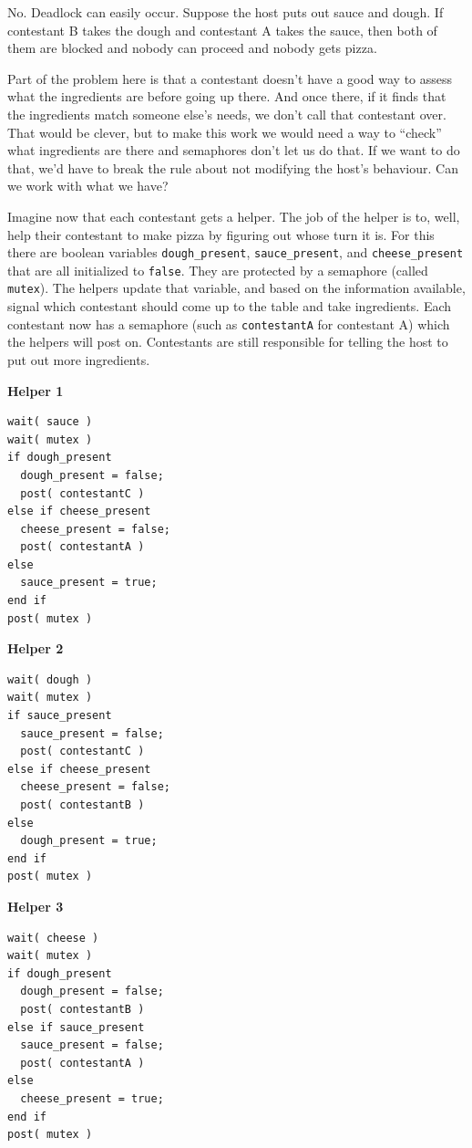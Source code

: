 \documentclass[a4paper]{report}
\begin{document}
No. Deadlock can easily occur. Suppose the host puts out sauce and dough. If contestant B takes the dough and contestant A takes the sauce, then both of them are blocked and nobody can proceed and nobody gets pizza.

Part of the problem here is that a contestant doesn't have a good way to assess what the ingredients are before going up there. And once there, if it finds that the ingredients match someone else's needs, we don't call that contestant over. That would be clever, but to make this work we would need a way to ``check'' what ingredients are there and semaphores don't let us do that. If we want to do that, we'd have to break the rule about not modifying the host's behaviour. Can we work with what we have?

Imagine now that each contestant gets a helper. The job of the helper is to, well, help their contestant to make pizza by figuring out whose turn it is. For this there are boolean variables \texttt{dough\_present}, \texttt{sauce\_present}, and \texttt{cheese\_present} that are all initialized to \texttt{false}. They are protected by a semaphore (called \texttt{mutex}). The helpers update that variable, and based on the information available, signal which contestant should come up to the table and take ingredients. Each contestant now has a semaphore (such as \texttt{contestantA} for contestant A) which the helpers will post on. Contestants are still responsible for telling the host to put out more ingredients.

\begin{multicols}{3}
	\textbf{Helper 1}
	\begin{lstlisting}
wait( sauce )
wait( mutex )
if dough_present  
  dough_present = false;
  post( contestantC )
else if cheese_present
  cheese_present = false;
  post( contestantA )
else
  sauce_present = true;
end if  
post( mutex )
\end{lstlisting}
	\columnbreak
	\textbf{Helper 2}
	\begin{lstlisting}
wait( dough )
wait( mutex )
if sauce_present  
  sauce_present = false;
  post( contestantC )
else if cheese_present
  cheese_present = false;
  post( contestantB )
else
  dough_present = true;
end if  
post( mutex )
\end{lstlisting}
	\columnbreak
	\textbf{Helper 3}
	\begin{lstlisting}
wait( cheese )
wait( mutex )
if dough_present  
  dough_present = false;
  post( contestantB )
else if sauce_present
  sauce_present = false;
  post( contestantA )
else
  cheese_present = true;
end if  
post( mutex )
\end{lstlisting}
\end{multicols}
\end{document}
